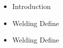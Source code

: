 \documentclass[11pt]{beamer}
\begin{document}
\begin{frame}
  \begin{itemize}[<+>]
      \item Introduction
      \item Welding Define
       \item Welding Define
  \end{itemize}
\end{frame}
\end{document}
